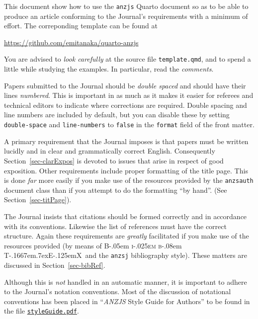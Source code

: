 \documentclass[
doublespace,
  times]{anzsauth}
\newcommand\BibTeX{{\rmfamily B\kern-.05em \textsc{i\kern-.025em b}\kern-.08em
T\kern-.1667em\lower.7ex\hbox{E}\kern-.125emX}}
\begin{document}
This document show how to use the \texttt{anzjs} Quarto document so as
to be able to produce an article conforming to the Journal's
requirements with a minimum of effort. The correponding template can be
found at

\url{https://github.com/emitanaka/quarto-anzjs}

You are advised to \emph{look carefully} at the source file
\texttt{template.qmd}, and to spend a little while studying the
examples. In particular, read the \emph{comments}.

Papers submitted to the Journal should be \emph{double spaced} and
should have their lines \emph{numbered}. This is important in as much as
it makes it easier for referees and technical editors to indicate where
corrections are required. Double spacing and line numbers are included
by default, but you can disable these by setting \texttt{double-space}
and \texttt{line-numbers} to \texttt{false} in the \texttt{format} field
of the front matter.

A primary requirement that the Journal imposes is that papers must be
written lucidly and in clear and grammatically correct English.
Consequently Section~\ref{sec-clarExpos} is devoted to issues that arise
in respect of good exposition. Other requirements include proper
formatting of the title page. This is done \emph{far} more easily if you
make use of the resources provided by the \texttt{anzsauth} document
class than if you attempt to do the formatting ``by hand''. (See
Section~\ref{sec-titPage}).

The Journal insists that citations should be formed correctly and in
accordance with its conventions. Likewise the list of references must
have the correct structure. Again these requirements are \emph{greatly}
facilitated if you make use of the resources provided (by means of
\BibTeX~and the \texttt{anzsj} bibliography style). These matters are
discussed in Section~\ref{sec-bibRef}.

Although this is \emph{not} handled in an automatic manner, it is
important to adhere to the Journal's notation conventions. Most of the
discussion of notational conventions has been placed in ``\emph{ANZJS}
Style Guide for Authors'' to be found in the file
\href{https://github.com/emitanaka/quarto-anzjs/blob/master/styleGuide.pdf}{\texttt{styleGuide.pdf}}.
\end{document}
